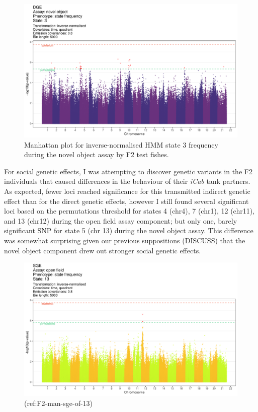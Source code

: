 \documentclass[
]{article}
\begin{document}
\begin{figure}
\includegraphics[width=1\linewidth]{figs/mikk_behaviour/manhattans/dge_no_3_time-quadrant} \caption{Manhattan plot for inverse-normalised HMM state 3 frequency during the novel object assay by F2 test fishes.}\label{fig:F2-man-dge-no-3}
\end{figure}

For social genetic effects, I was attempting to discover genetic variants in the F2 individuals that caused differences in the behaviour of their \emph{\textcolor{iCab_424B4D}{iCab}} tank partners. As expected, fewer loci reached significance for this transmitted indirect genetic effect than for the direct genetic effects, however I still found several significant loci based on the permutations threshold for states 4 (chr4), 7 (chr1), 12 (chr11), and 13 (chr12) during the open field assay component; but only one, barely significant SNP for state 5 (chr 13) during the novel object assay. This difference was somewhat surprising given our previous suppositions (DISCUSS) that the novel object component drew out stronger social genetic effects.

\begin{figure}
\includegraphics[width=1\linewidth]{figs/mikk_behaviour/manhattans/sge_of_13_time-quadrant} \caption{(ref:F2-man-sge-of-13)}\label{fig:F2-man-sge-of-13}
\end{figure}
\end{document}
